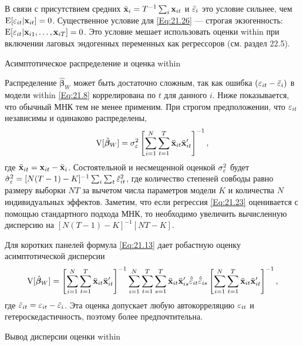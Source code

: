 В связи с присутствием средних $\bar{\mathbf{x}}_i=T^{-1}\sum_i\mathbf{x}_{it}$ и $\bar{\varepsilon}_i$ это условие сильнее, чем $\mathrm E[\varepsilon_{it}|\mathbf{x}_{it}]=0$. Существенное условие для \ref{Eq:21.26} --- строгая экзогенность: $\mathrm E[\varepsilon_{it}|\mathbf{x}_{i1}, \dots, \mathbf{x}_{iT}]=0$. Это условие мешает использовать оценки within при включении лаговых эндогенных переменных как регрессоров (см. раздел 22.5).

{\centering
Асимптотическое распределение и оценка within\\}

Распределение $\hat{\bm\beta}_W$ может быть достаточно сложным, так как ошибка $(\varepsilon_{it}-\bar{\varepsilon}_i)$ в модели within \ref{Eq:21.8} коррелирована по $t$ для данного $i$. Ниже показывается, что обычный МНК тем не менее применим. При строгом предположении, что $\varepsilon_{it}$ независимы и одинаково распределены,
\begin{align}
\mathrm V[\hat{\bm\beta}_W]=\sigma^2_{\varepsilon} \left[ \sum^N_{i=1} \sum^T_{t=1} \ddot{\mathbf{x}}_{it}\ddot{\mathbf{x}}'_{it} \right]^{-1},
\label{Eq:21.27}
\end{align}
где $\ddot{\mathbf{x}}_{it}=\mathbf{x}_{it}-\bar{\mathbf{x}}_i$. Состоятельной и несмещенной оценкой $\sigma^2_{\varepsilon}$ будет $\hat{\sigma}^2_{\varepsilon}=[N(T-1)-K]^{-1}\sum_i\sum_t \hat{\varepsilon}^2_{it}$, где количество степеней совбоды равно размеру выборки $NT$ за вычетом числа параметров модели $K$ и количества $N$ индивидуальных эффектов. Заметим, что если регрессия \ref{Eq:21.23} оценивается с помощью стандартного подхода МНК, то необходимо увеличить вычисленную дисперсию на $[N(T-1)-K]^{-1}[NT-K]$.

Для коротких панелей формула \ref{Eq:21.13} дает робастную оценку асимптотической дисперсии
\begin{align}
\mathrm V[\hat{\bm\beta}_W]= \left[ \sum^N_{i=1} \sum^T_{t=1} \ddot{\mathbf{x}}_{it}\ddot{\mathbf{x}}'_{it} \right]^{-1}
\sum^N_{i=1} \sum^T_{t=1} \sum^T_{s=1} \ddot{\mathbf{x}}_{it}\ddot{\mathbf{x}}'_{is} \hat{\ddot{\varepsilon}}_{it} \hat{\ddot{\varepsilon}}_{is}
\left[ \sum^N_{i=1} \sum^T_{t=1} \ddot{\mathbf{x}}_{it}\ddot{\mathbf{x}}'_{it} \right]^{-1},
\label{Eq:21.28}
\end{align}
где $\ddot{\varepsilon}_{it}=\varepsilon_{it}-\bar{\varepsilon}_i$. Эта оценка допускает любую автокорреляцию $\varepsilon_{it}$ и гетероскедастичность, поэтому более предпочтительна. 


{\centering
Вывод дисперсии оценки within\\}

